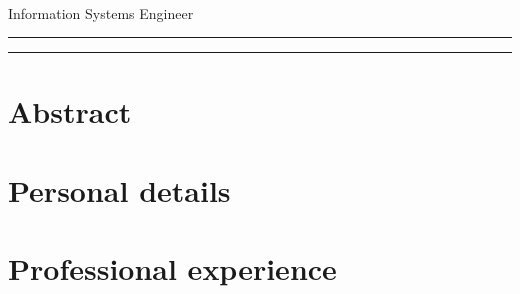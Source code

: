 \documentclass[10pt,a4paper]{article}
\begin{document}
\thispagestyle{empty}

\begin{flushright}
    \huge{\textbf{\name}} \\
    \large{Information Systems Engineer}
\end{flushright}
\hrule
\bigskip



\bigskip
\hrule

\bigskip

\section*{Abstract}


\section*{Personal details}


\section*{Professional experience}

\end{document}
